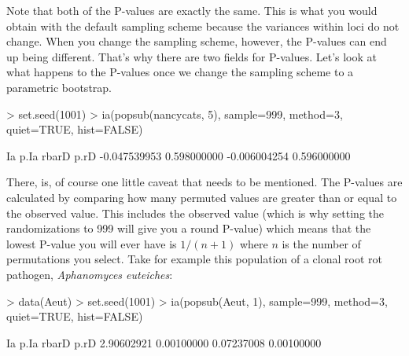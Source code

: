 \documentclass[letterpaper]{article}
\begin{document}
Note that both of the P-values are exactly the same. This is what you would obtain with the default sampling scheme because the variances within loci do not change. When you change the sampling scheme, however, the P-values can end up being different. That's why there are two fields for P-values. Let's look at what happens to the P-values once we change the sampling scheme to a parametric bootstrap.
\begin{Schunk}
\begin{Sinput}
> set.seed(1001)
> ia(popsub(nancycats, 5), sample=999, method=3, quiet=TRUE, hist=FALSE)
\end{Sinput}
\begin{Soutput}
          Ia         p.Ia        rbarD         p.rD 
-0.047539953  0.598000000 -0.006004254  0.596000000 
\end{Soutput}
\end{Schunk}

There, is, of course one little caveat that needs to be mentioned. The P-values are calculated by comparing how many permuted values are greater than or equal to the observed value. This includes the observed value (which is why setting the randomizations to 999 will give you a round P-value) which means that the lowest P-value you will ever have is $1/(n+1)$ where $n$ is the number of permutations you select. Take for example this population of a clonal root rot pathogen, \textit{Aphanomyces euteiches}:
\begin{Schunk}
\begin{Sinput}
> data(Aeut)
> set.seed(1001)
> ia(popsub(Aeut, 1), sample=999, method=3, quiet=TRUE, hist=FALSE)
\end{Sinput}
\begin{Soutput}
        Ia       p.Ia      rbarD       p.rD 
2.90602921 0.00100000 0.07237008 0.00100000 
\end{Soutput}
\end{Schunk}
\end{document}
